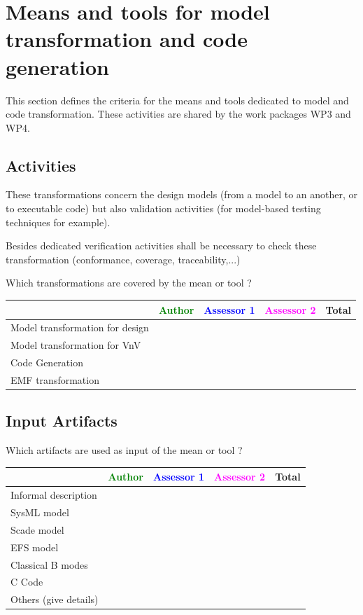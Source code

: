 \section{Means and tools for model transformation and code generation}
\label{sec:transformation}



This section defines the criteria for the means and tools dedicated to model and code transformation. These activities are shared by the work packages WP3 and WP4.


\subsection{Activities}

These transformations concern the design models  (from a model to an another, or to  executable code) but also validation activities (for model-based testing techniques for example).

Besides dedicated verification activities shall be necessary to  check these transformation (conformance, coverage, traceability,...)

Which transformations are covered by the mean or tool  ?

\begin{tabular}{|l | c | c | c | c|}
\hline
& \textcolor{green}{Author} & \textcolor{blue}{Assessor 1} & \textcolor{magenta}{Assessor 2} & Total \\
\hline 
Model transformation for design & & & &  \\
\hline
Model transformation for VnV  & & & & \\
\hline
Code Generation & & & & \\
\hline
EMF transformation & & & & \\
\hline
\end{tabular}


\subsection{Input Artifacts}

Which artifacts are used as input of the mean or tool  ? 


\begin{tabular}{|l | c | c | c | c|}
\hline
& \textcolor{green}{Author} & \textcolor{blue}{Assessor 1} & \textcolor{magenta}{Assessor 2} & Total \\
\hline 
Informal description & & & &  \\
\hline
SysML model & & & & \\
\hline
Scade model & & & & \\
\hline
EFS model & & & & \\
\hline
Classical B modes & & & &  \\
\hline
C Code & & & & \\
\hline
Others (give details) & & & & \\
\hline
\end{tabular}



